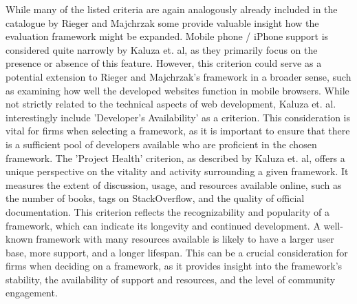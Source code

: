 While many of the listed criteria are again analogously already included in the catalogue by Rieger and Majchrzak some provide valuable insight how the evaluation framework might be expanded. Mobile phone / iPhone support is considered quite narrowly by Kaluza et. al, as they primarily focus on the presence or absence of this feature. However, this criterion could serve as a potential extension to Rieger and Majchrzak's framework in a broader sense, such as examining how well the developed websites function in mobile browsers. While not strictly related to the technical aspects of web development, Kaluza et. al. interestingly include 'Developer's Availability' as a criterion. This consideration is vital for firms when selecting a framework, as it is important to ensure that there is a sufficient pool of developers available who are proficient in the chosen framework. The 'Project Health' criterion, as described by Kaluza et. al, offers a unique perspective on the vitality and activity surrounding a given framework. It measures the extent of discussion, usage, and resources available online, such as the number of books, tags on StackOverflow, and the quality of official documentation. This criterion reflects the recognizability and popularity of a framework, which can indicate its longevity and continued development. A well-known framework with many resources available is likely to have a larger user base, more support, and a longer lifespan. This can be a crucial consideration for firms when deciding on a framework, as it provides insight into the framework's stability, the availability of support and resources, and the level of community engagement.
